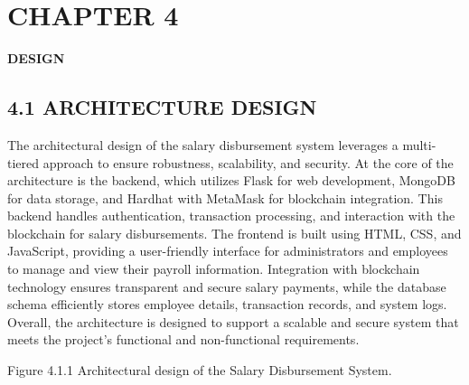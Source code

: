 \documentclass[12pt]{report}
\begin{document}
\newpage
\section*{CHAPTER 4}
\begin{center}
    \textbf{\fontsize{18pt}{21.6pt}\selectfont DESIGN}  %
\end{center}
\vspace{0.7em}
\subsection*{4.1 ARCHITECTURE DESIGN}
\begin{center}
    \justify
The architectural design of the salary disbursement system leverages a multi-tiered approach to ensure robustness, scalability, and security. At the core of the architecture is the backend, which utilizes Flask for web development, MongoDB for data storage, and Hardhat with MetaMask for blockchain integration. This backend handles authentication, transaction processing, and interaction with the blockchain for salary disbursements. The frontend is built using HTML, CSS, and JavaScript, providing a user-friendly interface for administrators and employees to manage and view their payroll information. Integration with blockchain technology ensures transparent and secure salary payments, while the database schema efficiently stores employee details, transaction records, and system logs. Overall, the architecture is designed to support a scalable and secure system that meets the project’s functional and non-functional requirements.   
\end{center}
\vspace{1em}
\begin{figure}[h!]
\centering
{}
\end{figure}
\begin{center}
    Figure 4.1.1 Architectural design of the Salary Disbursement System.
\end{center}
\newpage
\end{document}
